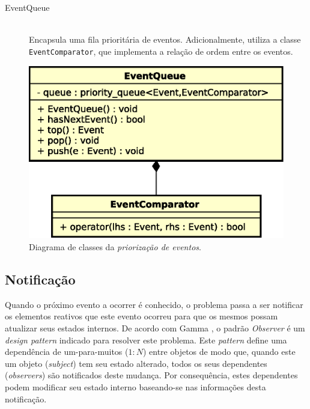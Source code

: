\begin{description}
  \item[EventQueue] \hfill \\
    Encapsula uma fila prioritária de eventos. Adicionalmente, utiliza a classe
    \texttt{EventComparator}, que implementa a relação de ordem entre os
    eventos.

\end{description}

\begin{figure}[htb!]
  \centering
  \includegraphics[scale=0.6]{img/EventQueue}
  \caption{Diagrama de classes da \textit{priorização de eventos}.}
\label{fig:diagram:event:manage}
\end{figure}

\subsection{Notificação}

Quando o próximo evento a ocorrer é conhecido, o problema passa a ser notificar
os elementos reativos que este evento ocorreu para que os mesmos possam
atualizar seus estados internos. De acordo com Gamma
\cite{Gamma:1995:DPE:186897}, o padrão \textit{Observer} é um \textit{design
pattern} indicado para resolver este problema. Este \textit{pattern} define uma
dependência de um-para-muitos ($1:N$) entre objetos de modo que, quando este um
objeto (\textit{subject}) tem seu estado alterado, todos os seus dependentes
(\textit{observers}) são notificados deste mudança. Por consequência, estes
dependentes podem modificar seu estado interno baseando-se nas informações desta
notificação.

